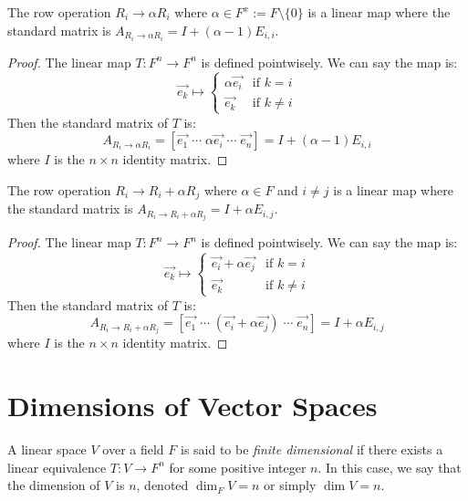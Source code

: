 \documentclass[
	11pt, %
	fleqn, %
	a4paper, %
]{LegrandOrangeBook}
\begin{document}
\begin{proposition}
    The row operation $R_i \to \alpha R_i$ where $\alpha \in F^x := F \setminus \{0\}$ is a linear map where the standard matrix is $A_{R_i \to \alpha R_i} = I + (\alpha - 1) E_{i,i}$.
\end{proposition}

\begin{proof}
    The linear map $T: F^n \to F^n$ is defined pointwisely. We can say the map is:
    \[
        \vec{e_k} \mapsto \begin{cases}
            \alpha \vec{e_i} & \text{if } k = i \\
            \vec{e_k} & \text{if } k \neq i
        \end{cases}
    \]
    Then the standard matrix of $T$ is:
    \[
        A_{R_i \to \alpha R_i} = [\vec{e_1} \; \cdots \; \alpha\vec{e_i} \; \cdots \; \vec{e_n}] = I + (\alpha - 1) E_{i,i}
    \]
    where $I$ is the $n \times n$ identity matrix.
\end{proof}

\begin{proposition}
    The row operation $R_i \to R_i + \alpha R_j$ where $\alpha \in F$ and $i \neq j$ is a linear map where the standard matrix is $A_{R_i \to R_i + \alpha R_j} = I + \alpha E_{i,j}$.
\end{proposition}

\begin{proof}
    The linear map $T: F^n \to F^n$ is defined pointwisely. We can say the map is:
    \[
        \vec{e_k} \mapsto \begin{cases}
            \vec{e_i} + \alpha \vec{e_j} & \text{if } k = i \\
            \vec{e_k} & \text{if } k \neq i
        \end{cases}
    \]
    Then the standard matrix of $T$ is:
    \[
        A_{R_i \to R_i + \alpha R_j} = [\vec{e_1} \; \cdots \; (\vec{e_i} + \alpha\vec{e_j}) \; \cdots \; \vec{e_n}] = I + \alpha E_{i,j}
    \]
    where $I$ is the $n \times n$ identity matrix.
\end{proof}

\newpage

\section{Dimensions of Vector Spaces}

\begin{definition}
    A linear space $V$ over a field $F$ is said to be \emph{finite dimensional} if there exists a linear equivalence $T: V \to F^n$ for some positive integer $n$. In this case, we say that the dimension of $V$ is $n$, denoted $\dim_{F} V = n$ or simply $\dim V = n$.
\end{definition}
\end{document}
